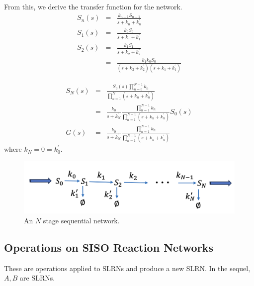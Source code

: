\documentclass[unnumsec,webpdf,contemporary,large]{oup-authoring-template}%
\theoremstyle{thmstyleone}%
\theoremstyle{thmstyletwo}%
\theoremstyle{thmstylethree}%
\begin{document}
From this, we derive the transfer function for the network.
\begin{align}
S_n (s) & = & \frac{k_{n-1} S_{n-1}}{s + k_n + k^{\prime}_n} \nonumber \\
S_1 (s) & = & \frac{k_0 S_0}{s + k_1 + k^{\prime}_1} \nonumber \\
S_2 (s) & = & \frac{k_1 S_1}{s + k_2 + k^{\prime}_2} \nonumber \\
  & = & \frac{k_1 k_0 S_0}{(s + k_2 + k^{\prime}_2)(s + k_1 + k^{\prime}_1)}
\end{align}

\begin{eqnarray}
S_N (s) & = & \frac{S_0 (s) \prod_{n=0}^{N-1} k_n }{\prod_{n=1}^N(s + k_n + k^{\prime}_n)} \nonumber \\
    & = &  \frac{ k_0 }{s  +  k^{\prime}_N}  
    \frac{\prod_{n=1}^{N-1} k_n }{\prod_{n=1}^{N-1}(s + k_n + k^{\prime}_n)} S_0(s) \nonumber \\
G (s) & = &  \frac{ k_0 }{s  +  k^{\prime}_N}  
    \frac{\prod_{n=1}^{N-1} k_n }{\prod_{n=1}^{N-1}(s + k_n + k^{\prime}_n)}
\end{eqnarray}
where $k_N = 0= k^{\prime}_0$.

\begin{figure}
        \centering
         \includegraphics[scale=0.4]{figures/sequential_network.png}
          \caption[]{An $N$ stage sequential network.}
         \label{fig:sequential_network}
\end{figure}


\subsection{Operations on SISO Reaction Networks}
These are operations applied to SLRNs and produce a new SLRN.
In the sequel, $A, B$ are SLRNs.
\end{document}
